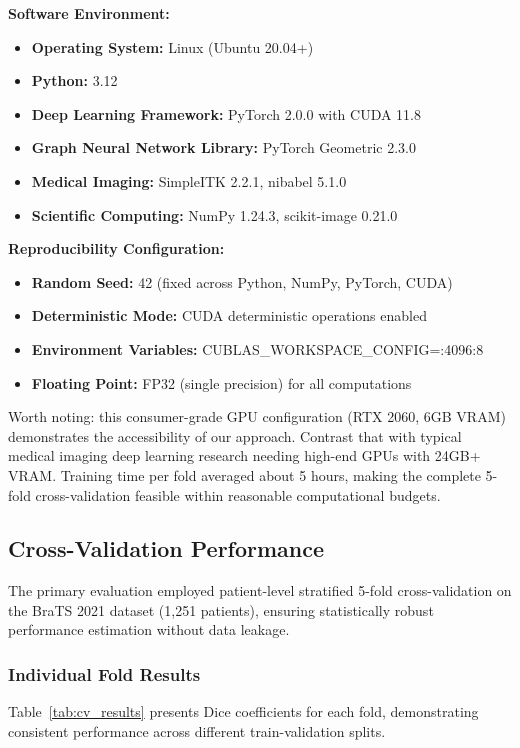 \textbf{Software Environment:}
\begin{itemize}
    \item \textbf{Operating System:} Linux (Ubuntu 20.04+)
    \item \textbf{Python:} 3.12
    \item \textbf{Deep Learning Framework:} PyTorch 2.0.0 with CUDA 11.8
    \item \textbf{Graph Neural Network Library:} PyTorch Geometric 2.3.0
    \item \textbf{Medical Imaging:} SimpleITK 2.2.1, nibabel 5.1.0
    \item \textbf{Scientific Computing:} NumPy 1.24.3, scikit-image 0.21.0
\end{itemize}

\textbf{Reproducibility Configuration:}
\begin{itemize}
    \item \textbf{Random Seed:} 42 (fixed across Python, NumPy, PyTorch, CUDA)
    \item \textbf{Deterministic Mode:} CUDA deterministic operations enabled
    \item \textbf{Environment Variables:} CUBLAS\_WORKSPACE\_CONFIG=:4096:8
    \item \textbf{Floating Point:} FP32 (single precision) for all computations
\end{itemize}

Worth noting: this consumer-grade GPU configuration (RTX 2060, 6GB VRAM) demonstrates the accessibility of our approach. Contrast that with typical medical imaging deep learning research needing high-end GPUs with 24GB+ VRAM. Training time per fold averaged about 5 hours, making the complete 5-fold cross-validation feasible within reasonable computational budgets.


\subsection{Cross-Validation Performance}

The primary evaluation employed patient-level stratified 5-fold cross-validation on the BraTS 2021 dataset (1,251 patients), ensuring statistically robust performance estimation without data leakage.

\subsubsection{Individual Fold Results}

Table~\ref{tab:cv_results} presents Dice coefficients for each fold, demonstrating consistent performance across different train-validation splits.

